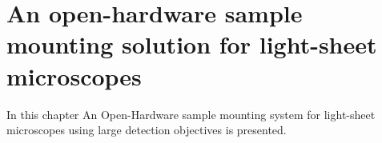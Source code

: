 \ifpdf
    \graphicspath{{Chapters/chamber/Figs/Raster/}{Chapters/chamber/Figs/PDF/}{Chapters/chamber/Figs/}}
\else
    \graphicspath{{Chapters/chamber/Figs/Vector/}{Chapters/chamber/Figs/}}
\fi


\chapter{An open-hardware sample mounting solution for light-sheet microscopes}\label{chapter:chamber}

 In this chapter An Open-Hardware sample mounting system for light-sheet microscopes using large detection objectives is presented.

